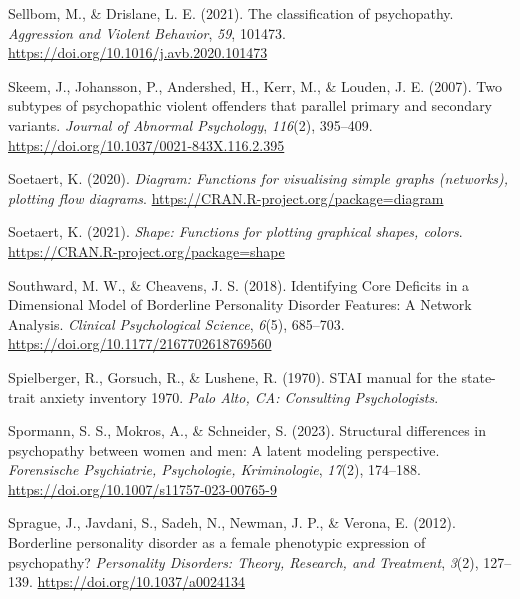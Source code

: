 \documentclass[
  man,floatsintext]{apa7}
\newlength{\cslhangindent}
\newlength{\cslentryspacingunit} %
\newenvironment{CSLReferences}[2] %
 {%
  \setlength{\parindent}{0pt}
  \ifodd #1
  \let\oldpar\par
  \def\par{\hangindent=\cslhangindent\oldpar}
  \fi
  \setlength{\parskip}{#2\cslentryspacingunit}
 }%
 {}
\begin{document}
\begin{CSLReferences}{1}{0}
\leavevmode{}%
Sellbom, M., \& Drislane, L. E. (2021). The classification of psychopathy. \emph{Aggression and Violent Behavior}, \emph{59}, 101473. \url{https://doi.org/10.1016/j.avb.2020.101473}

\leavevmode{}%
Skeem, J., Johansson, P., Andershed, H., Kerr, M., \& Louden, J. E. (2007). Two subtypes of psychopathic violent offenders that parallel primary and secondary variants. \emph{Journal of Abnormal Psychology}, \emph{116}(2), 395--409. \url{https://doi.org/10.1037/0021-843X.116.2.395}

\leavevmode{}%
Soetaert, K. (2020). \emph{Diagram: Functions for visualising simple graphs (networks), plotting flow diagrams}. \url{https://CRAN.R-project.org/package=diagram}

\leavevmode{}%
Soetaert, K. (2021). \emph{Shape: Functions for plotting graphical shapes, colors}. \url{https://CRAN.R-project.org/package=shape}

\leavevmode{}%
Southward, M. W., \& Cheavens, J. S. (2018). Identifying {Core Deficits} in a {Dimensional Model} of {Borderline Personality Disorder Features}: {A Network Analysis}. \emph{Clinical Psychological Science}, \emph{6}(5), 685--703. \url{https://doi.org/10.1177/2167702618769560}

\leavevmode{}%
Spielberger, R., Gorsuch, R., \& Lushene, R. (1970). STAI manual for the state-trait anxiety inventory 1970. \emph{Palo Alto, CA: Consulting Psychologists}.

\leavevmode{}%
Spormann, S. S., Mokros, A., \& Schneider, S. (2023). Structural differences in psychopathy between women and men: A latent modeling perspective. \emph{Forensische Psychiatrie, Psychologie, Kriminologie}, \emph{17}(2), 174--188. \url{https://doi.org/10.1007/s11757-023-00765-9}

\leavevmode{}%
Sprague, J., Javdani, S., Sadeh, N., Newman, J. P., \& Verona, E. (2012). Borderline personality disorder as a female phenotypic expression of psychopathy? \emph{Personality Disorders: Theory, Research, and Treatment}, \emph{3}(2), 127--139. \url{https://doi.org/10.1037/a0024134}


\end{CSLReferences}
\end{document}
